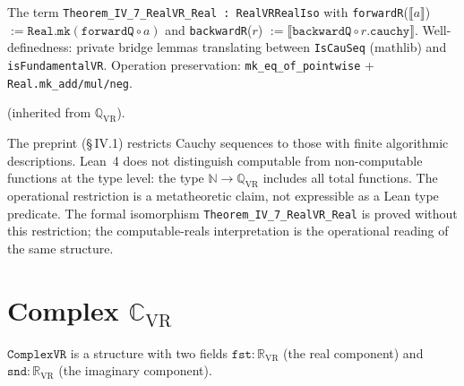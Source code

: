 \begin{theorem}
\label{thm:T_IV_7}
\leanok
{}
The term \texttt{Theorem\_IV\_7\_RealVR\_Real : RealVRRealIso} with
\texttt{forwardR}($\llbracket a \rrbracket$) $:= \texttt{Real.mk}(\texttt{forwardQ} \circ a)$
and \texttt{backwardR}($r$) $:= \llbracket \texttt{backwardQ} \circ r.\texttt{cauchy} \rrbracket$.
Well-definedness: private bridge lemmas translating between
\texttt{IsCauSeq} (mathlib) and \texttt{isFundamentalVR}.
Operation preservation: \texttt{mk\_eq\_of\_pointwise} + \texttt{Real.mk\_add/mul/neg}.

\noindent{} (inherited from $\mathbb{Q}_{\mathrm{VR}}$).
\end{theorem}

\begin{remark}
\label{rem:RealVR_computable}
\leanok
{}
The preprint (§\,IV.1) restricts Cauchy sequences to those with finite
algorithmic descriptions.  Lean~4 does not distinguish computable from
non-computable functions at the type level: the type $\mathbb{N} \to
\mathbb{Q}_{\mathrm{VR}}$ includes all total functions.  The operational
restriction is a metatheoretic claim, not expressible as a Lean type predicate.
The formal isomorphism \texttt{Theorem\_IV\_7\_RealVR\_Real} is proved without
this restriction; the computable-reals interpretation is the operational
reading of the same structure.
\end{remark}

\section{Complex $\mathbb{C}_{\mathrm{VR}}$}
\label{sec:complex}

\begin{definition}
\label{def:ComplexVR}
\leanok
{}
$\texttt{ComplexVR}$ is a structure with two fields
$\texttt{fst} : \mathbb{R}_{\mathrm{VR}}$ (the real component) and
$\texttt{snd} : \mathbb{R}_{\mathrm{VR}}$ (the imaginary component).
\end{definition}

